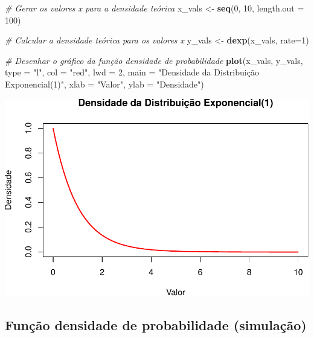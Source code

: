 \documentclass[
]{book}
\newenvironment{Shaded}{\begin{snugshade}}{\end{snugshade}}
\newcommand{\AttributeTok}[1]{\textcolor[rgb]{0.13,0.29,0.53}{#1}}
\newcommand{\CommentTok}[1]{\textcolor[rgb]{0.56,0.35,0.01}{\textit{#1}}}
\newcommand{\DecValTok}[1]{\textcolor[rgb]{0.00,0.00,0.81}{#1}}
\newcommand{\FunctionTok}[1]{\textcolor[rgb]{0.13,0.29,0.53}{\textbf{#1}}}
\newcommand{\NormalTok}[1]{#1}
\newcommand{\OtherTok}[1]{\textcolor[rgb]{0.56,0.35,0.01}{#1}}
\newcommand{\StringTok}[1]{\textcolor[rgb]{0.31,0.60,0.02}{#1}}
\theoremstyle{definition}
\theoremstyle{definition}
\theoremstyle{definition}
\theoremstyle{definition}
\theoremstyle{remark}
\begin{document}
\begin{Shaded}
\begin{Highlighting}[]
\CommentTok{\# Gerar os valores x para a densidade teórica}
\NormalTok{x\_vals }\OtherTok{\textless{}{-}} \FunctionTok{seq}\NormalTok{(}\DecValTok{0}\NormalTok{, }\DecValTok{10}\NormalTok{, }\AttributeTok{length.out =} \DecValTok{100}\NormalTok{)}

\CommentTok{\# Calcular a densidade teórica para os valores x}
\NormalTok{y\_vals }\OtherTok{\textless{}{-}} \FunctionTok{dexp}\NormalTok{(x\_vals, }\AttributeTok{rate=}\DecValTok{1}\NormalTok{)}

\CommentTok{\# Desenhar o gráfico da função densidade de probabilidade}
\FunctionTok{plot}\NormalTok{(x\_vals, y\_vals, }\AttributeTok{type =} \StringTok{"l"}\NormalTok{, }
     \AttributeTok{col =} \StringTok{"red"}\NormalTok{, }\AttributeTok{lwd =} \DecValTok{2}\NormalTok{, }
     \AttributeTok{main =} \StringTok{"Densidade da Distribuição Exponencial(1)"}\NormalTok{,}
     \AttributeTok{xlab =} \StringTok{"Valor"}\NormalTok{, }\AttributeTok{ylab =} \StringTok{"Densidade"}\NormalTok{)}
\end{Highlighting}
\end{Shaded}

\includegraphics{meuLivro2_files/figure-latex/unnamed-chunk-123-1.pdf}

\subsection{Função densidade de probabilidade (simulação)}\label{funuxe7uxe3o-densidade-de-probabilidade-simulauxe7uxe3o-1}
\end{document}
